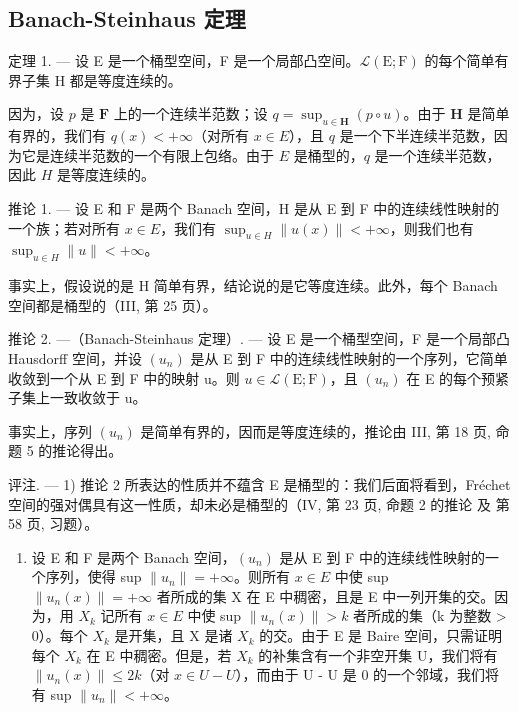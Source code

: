\subsection{Banach-Steinhaus 定理}

定理 1. --- 设 E 是一个桶型空间，F 是一个局部凸空间。\(\mathcal{L}(\mathrm{E};\mathrm{F})\) 的每个简单有界子集 H 都是等度连续的。

因为，设 \(p\) 是 \(\mathbf{F}\) 上的一个连续半范数；设 \(q = \sup_{u\in \mathbf{H}}(p\circ u)\)。由于 \(\mathbf{H}\) 是简单有界的，我们有 \(q(x) < +\infty\)（对所有 \(x \in E\)），且 \(q\) 是一个下半连续半范数，因为它是连续半范数的一个有限上包络。由于 \(E\) 是桶型的，\(q\) 是一个连续半范数，因此 \(H\) 是等度连续的。

推论 1. --- 设 E 和 F 是两个 Banach 空间，H 是从 E 到 F 中的连续线性映射的一个族；若对所有 \(x \in E\)，我们有 \(\sup_{u \in H} \|u(x)\| < +\infty\)，则我们也有 \(\sup_{u \in H} \|u\| < +\infty\)。

事实上，假设说的是 H 简单有界，结论说的是它等度连续。此外，每个 Banach 空间都是桶型的（III, 第 25 页）。

推论 2. ---（Banach-Steinhaus 定理）. --- 设 E 是一个桶型空间，F 是一个局部凸 Hausdorff 空间，并设 \((u_n)\) 是从 E 到 F 中的连续线性映射的一个序列，它简单收敛到一个从 E 到 F 中的映射 u。则 \(u \in \mathcal{L}(\mathrm{E}; \mathrm{F})\)，且 \((u_{n})\) 在 E 的每个预紧子集上一致收敛于 u。

事实上，序列 \((u_{n})\) 是简单有界的，因而是等度连续的，推论由 III, 第 18 页, 命题 5 的推论得出。

评注. --- 1) 推论 2 所表达的性质并不蕴含 E 是桶型的：我们后面将看到，Fréchet 空间的强对偶具有这一性质，却未必是桶型的（IV, 第 23 页, 命题 2 的推论 及 第 58 页, 习题）。

\begin{enumerate}
\def\labelenumi{\arabic{enumi})}
\setcounter{enumi}{1}
\tightlist
\item
  设 E 和 F 是两个 Banach 空间，\((u_{n})\) 是从 E 到 F 中的连续线性映射的一个序列，使得 sup \(\|u_{n}\| = +\infty\)。则所有 \(x \in E\) 中使 sup \(\|u_{n}(x)\| = +\infty\) 者所成的集 X 在 E 中稠密，且是 E 中一列开集的交。因为，用 \(X_{k}\) 记所有 \(x \in E\) 中使 sup \(\|u_{n}(x)\| > k\) 者所成的集（k 为整数 \textgreater{} 0）。每个 \(X_{k}\) 是开集，且 X 是诸 \(X_{k}\) 的交。由于 E 是 Baire 空间，只需证明每个 \(X_{k}\) 在 E 中稠密。但是，若 \(X_{k}\) 的补集含有一个非空开集 U，我们将有 \(\|u_{n}(x)\| \leqslant 2k\)（对 \(x \in U - U\)），而由于 U - U 是 0 的一个邻域，我们将有 sup \(\|u_{n}\| < +\infty\)。
\end{enumerate}

